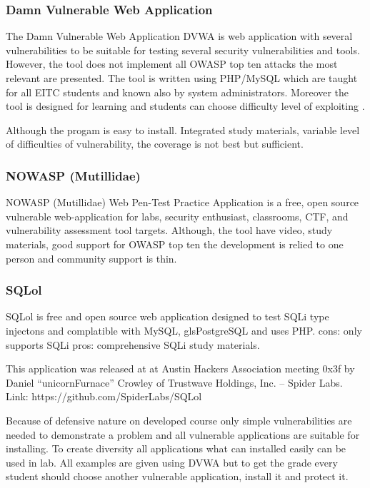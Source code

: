 \subsubsection{Damn Vulnerable Web Application}
The Damn Vulnerable Web Application \gls{DVWA} is web application with several vulnerabilities to be suitable for testing several security vulnerabilities and tools. However, the tool does not implement all \gls{OWASP} top ten attacks the most relevant are presented. The tool is written using PHP/MySQL which are taught for all \gls{EITC} students and known also by system administrators. Moreover the tool is designed for learning and students can choose difficulty level of exploiting \citep{website:dvwa}.

Although the progam is easy to install. Integrated study materials, variable level of  difficulties of vulnerability, the coverage is not best but sufficient.

\subsubsection{NOWASP (Mutillidae)}
NOWASP (Mutillidae) Web Pen-Test Practice Application is a free, open source vulnerable web-application for labs, security enthusiast, classrooms, \gls{CTF}, and vulnerability assessment tool targets. \citep{website:Mutillidae} Although, the tool have video, study materials, good support for \gls{OWASP} top ten the development is relied to one person and community support is thin.
\subsubsection{SQLol}
SQLol is free and open source web application designed to test \gls{SQLi} type injectons and complatible with \gls{MySQL}, gls{PostgreSQL} and uses \gls{PHP}.
cons: only supports \gls{SQLi}
pros: comprehensive  \gls{SQLi} study materials.

 This application was released at at Austin Hackers Association meeting 0x3f by Daniel “unicornFurnace” Crowley of Trustwave Holdings, Inc. – Spider Labs.
Link: https://github.com/SpiderLabs/SQLol



Because of defensive nature on developed course only simple vulnerabilities are needed to demonstrate a problem and all vulnerable applications are suitable for installing. To create diversity all applications what can installed easily can be used in lab. All examples are given using \gls{DVWA} but to get the grade every student should choose another vulnerable application, install it and protect it.

